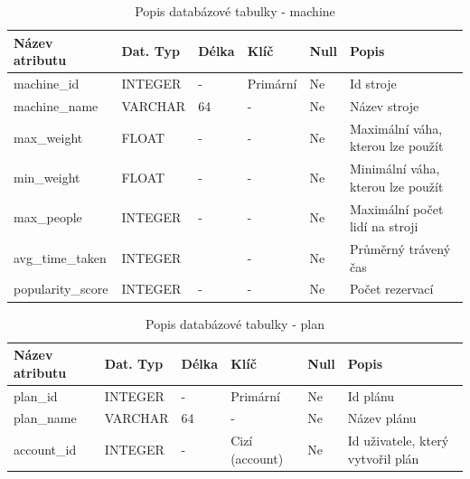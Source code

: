 \begin{table}[h!]
	\caption{Popis databázové tabulky - machine}
    \label{tab:dat-dictionary-machine}
	\begin{tabular}{|p{3.5cm}|p{2cm}|p{1cm}|p{2.5cm}|p{.75cm}|p{3.75cm}|}
		\hline
        \textbf{Název atributu} & \textbf{Dat. Typ} & \textbf{Délka} & \textbf{Klíč} & \textbf{Null} & \textbf{Popis} \\
        \hline
            machine\_id & INTEGER   &  -    & Primární       & Ne & Id stroje \\
            \hline
            machine\_name     & VARCHAR   &  64   & -                 & Ne & Název stroje \\
            \hline
            max\_weight       & FLOAT   &  -   & -                 & Ne &  Maximální váha, kterou lze použít \\
            \hline
            min\_weight       & FLOAT   &  -    & -                 & Ne &  Minimální váha, kterou lze použít \\
            \hline
            max\_people       & INTEGER   &  -  & -                 & Ne & Maximální počet lidí na stroji \\
            \hline
            avg\_time\_taken    & INTEGER   &     & -                 & Ne & Průměrný trávený čas \\
            \hline
            popularity\_score & INTEGER      &  -    & -                 & Ne &  Počet rezervací \\
        \hline
	\end{tabular}
\end{table}

\begin{table}[h!]
	\caption{Popis databázové tabulky - plan}
    \label{tab:dat-dictionary-plan}
	\begin{tabular}{|p{3.5cm}|p{2cm}|p{1cm}|p{2.5cm}|p{.75cm}|p{3.75cm}|}
		\hline
        \textbf{Název atributu} & \textbf{Dat. Typ} & \textbf{Délka} & \textbf{Klíč} & \textbf{Null} & \textbf{Popis} \\
        \hline
            plan\_id & INTEGER   &  -    & Primární       & Ne & Id plánu \\
        \hline
            plan\_name     & VARCHAR   &  64   & -                 & Ne & Název plánu \\
        \hline
            account\_id     & INTEGER   &  -   & Cizí (account)                 & Ne & Id uživatele, který vytvořil plán \\
        \hline
	\end{tabular}
\end{table}

